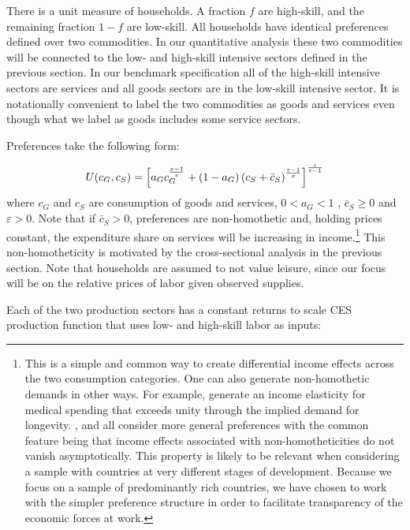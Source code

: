 \documentclass[12pt,english]{article}
\begin{document}
There is a unit measure of households. A fraction $f$ are high-skill, and
the remaining fraction $1-f$ are low-skill. All households have identical
preferences defined over two commodities. In our quantitative analysis these
two commodities will be connected to the low- and high-skill intensive
sectors defined in the previous section. In our benchmark specification all
of the high-skill intensive sectors are services and all goods sectors are
in the low-skill intensive sector. It is notationally convenient to label
the two commodities as goods and services even though what we label as goods
includes some service sectors.

Preferences take the following form:

\begin{equation*}
U(c_{G},c_{S})=\left[ a_{G}c_{G}^{\frac{\varepsilon -1}{\varepsilon }%
}+(1-a_{G})\left( c_{S}+\bar{c}_{S}\right) ^{\frac{\varepsilon -1}{%
\varepsilon }}\right] ^{\frac{\varepsilon }{\varepsilon -1}}
\end{equation*}
where $c_{G}$ and $c_{S}$ are consumption of goods and services, $0<a_{G}<1$%
, $\bar{c}_{S}\geq 0$ and $\varepsilon >0$. Note that if $\bar{c}_{S}>0$,
preferences are non-homothetic and, holding prices constant, the expenditure
share on services will be increasing in income.\footnote{%
This is a simple and common way to create differential income effects across
the two consumption categories. One can also generate non-homothetic demands
in other ways. For example, \citet{HalJon07} generate an income elasticity
for medical spending that exceeds unity through the implied demand for
longevity. \citet{Bop14}, \citet{Swi14} and \citet{CLM15} all consider more
general preferences with the common feature being that income effects
associated with non-homotheticities do not vanish asymptotically. This
property is likely to be relevant when considering a sample with countries
at very different stages of development. Because we focus on a sample of
predominantly rich countries, we have chosen to work with the simpler
preference structure in order to facilitate transparency of the economic
forces at work.} This non-homotheticity is motivated by the cross-sectional
analysis in the previous section. Note that households are assumed to not
value leisure, since our focus will be on the relative prices of labor given
observed supplies.

Each of the two production sectors has a constant returns to scale CES
production function that uses low- and high-skill labor as inputs:
\end{document}
